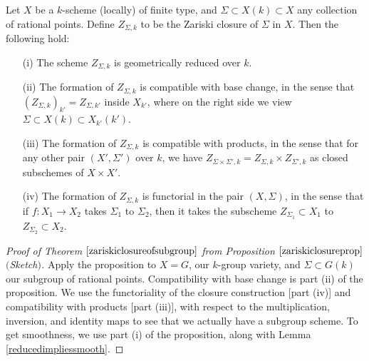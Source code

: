 \documentclass[10pt]{article}
\renewcommand{\(}{\left(}
\renewcommand{\)}{\right)}
\numberwithin{thm}{subsection}
\begin{document}
\begin{prop}\label{zariskiclosureprop}Let
$X$ be a $k$-scheme (locally) of finite type,
and $\Sigma\subset X(k)\subset X$ any collection of rational points.
Define $Z_{\Sigma,k}$ to be the Zariski closure of $\Sigma$ in $X$.
Then the following hold:
\begin{itemize}
\item[(i)]The scheme $Z_{\Sigma,k}$ is geometrically reduced over $k$.
\item[(ii)]The formation of $Z_{\Sigma,k}$ is compatible with base change,
in the sense that $(Z_{\Sigma,k})_{k'}=Z_{\Sigma,k'}$ inside $X_{k'}$,
where on the right side we view $\Sigma\subset X(k)\subset X_{k'}(k')$.
\item[(iii)]The formation of $Z_{\Sigma,k}$ is compatible with products, 
in the sense that for any other pair $(X',\Sigma')$ over $k$,
we have $Z_{\Sigma\times\Sigma',k}=Z_{\Sigma,k}\times Z_{\Sigma',k}$ as closed
subschemes of $X\times X'$.
\item[(iv)]The formation of $Z_{\Sigma,k}$ is functorial in the pair
$(X,\Sigma)$, in the sense
that if $f:X_1\to X_2$
takes $\Sigma_1$ to $\Sigma_2$,
then it takes the subscheme $Z_{\Sigma_1}\subset X_1$
to $Z_{\Sigma_2}\subset X_2$.
\end{itemize}
\end{prop}
\begin{proof}[Proof of Theorem  $\ref{zariskiclosureofsubgroup}$
from Proposition $\ref{zariskiclosureprop}$ $($Sketch$)$]
Apply the proposition to $X=G$, our $k$-group variety,
and $\Sigma\subset G(k)$ our subgroup of rational points.
Compatibility with base change is part (ii) of the proposition.
We use the functoriality of the closure construction [part (iv)]
and compatibility with products [part (iii)], with respect to the multiplication,
inversion, and identity maps to see that we actually have a subgroup scheme.
To get smoothness, we use part (i) of the proposition, along with Lemma \ref{reducedimpliessmooth}.
\end{proof}
\end{document}
